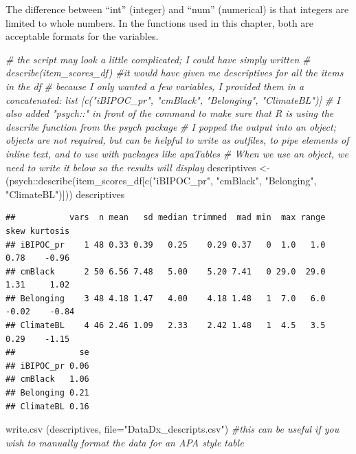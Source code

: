 \documentclass[
  11pt,
]{book}
\newenvironment{Shaded}{\begin{snugshade}}{\end{snugshade}}
\newcommand{\AttributeTok}[1]{\textcolor[rgb]{0.77,0.63,0.00}{#1}}
\newcommand{\CommentTok}[1]{\textcolor[rgb]{0.56,0.35,0.01}{\textit{#1}}}
\newcommand{\FunctionTok}[1]{\textcolor[rgb]{0.00,0.00,0.00}{#1}}
\newcommand{\NormalTok}[1]{#1}
\newcommand{\OtherTok}[1]{\textcolor[rgb]{0.56,0.35,0.01}{#1}}
\newcommand{\SpecialCharTok}[1]{\textcolor[rgb]{0.00,0.00,0.00}{#1}}
\newcommand{\StringTok}[1]{\textcolor[rgb]{0.31,0.60,0.02}{#1}}
\begin{document}
The difference between ``int'' (integer) and ``num'' (numerical) is that integers are limited to whole numbers. In the functions used in this chapter, both are acceptable formats for the variables.

\begin{Shaded}
\begin{Highlighting}[]
\CommentTok{\# the script may look a little complicated; I could have simply written}
\CommentTok{\# describe(item\_scores\_df) \#it would have given me descriptives for all the items in the df}
\CommentTok{\# because I only wanted a few variables, I provided them in a concatenated: list [c("iBIPOC\_pr", "cmBlack", "Belonging", "ClimateBL")]}
\CommentTok{\# I also added "psych::" in front of the command to make sure that R is using the describe function from the psych package}
\CommentTok{\# I popped the output into an object; objects are not required, but can be helpful to write as outfiles, to pipe elements of inline text, and to use with packages like apaTables}
\CommentTok{\# When we use an object, we need to write it below so the results will display}
\NormalTok{descriptives }\OtherTok{\textless{}{-}}\NormalTok{ (psych}\SpecialCharTok{::}\FunctionTok{describe}\NormalTok{(item\_scores\_df[}\FunctionTok{c}\NormalTok{(}\StringTok{"iBIPOC\_pr"}\NormalTok{, }\StringTok{"cmBlack"}\NormalTok{, }\StringTok{"Belonging"}\NormalTok{, }\StringTok{"ClimateBL"}\NormalTok{)]))}
\NormalTok{descriptives}
\end{Highlighting}
\end{Shaded}

\begin{verbatim}
##           vars  n mean   sd median trimmed  mad min  max range  skew kurtosis
## iBIPOC_pr    1 48 0.33 0.39   0.25    0.29 0.37   0  1.0   1.0  0.78    -0.96
## cmBlack      2 50 6.56 7.48   5.00    5.20 7.41   0 29.0  29.0  1.31     1.02
## Belonging    3 48 4.18 1.47   4.00    4.18 1.48   1  7.0   6.0 -0.02    -0.84
## ClimateBL    4 46 2.46 1.09   2.33    2.42 1.48   1  4.5   3.5  0.29    -1.15
##             se
## iBIPOC_pr 0.06
## cmBlack   1.06
## Belonging 0.21
## ClimateBL 0.16
\end{verbatim}

\begin{Shaded}
\begin{Highlighting}[]
\FunctionTok{write.csv}\NormalTok{ (descriptives, }\AttributeTok{file=}\StringTok{"DataDx\_descripts.csv"}\NormalTok{) }\CommentTok{\#this can be useful if you wish to manually format the data for an APA style table}
\end{Highlighting}
\end{Shaded}
\end{document}
